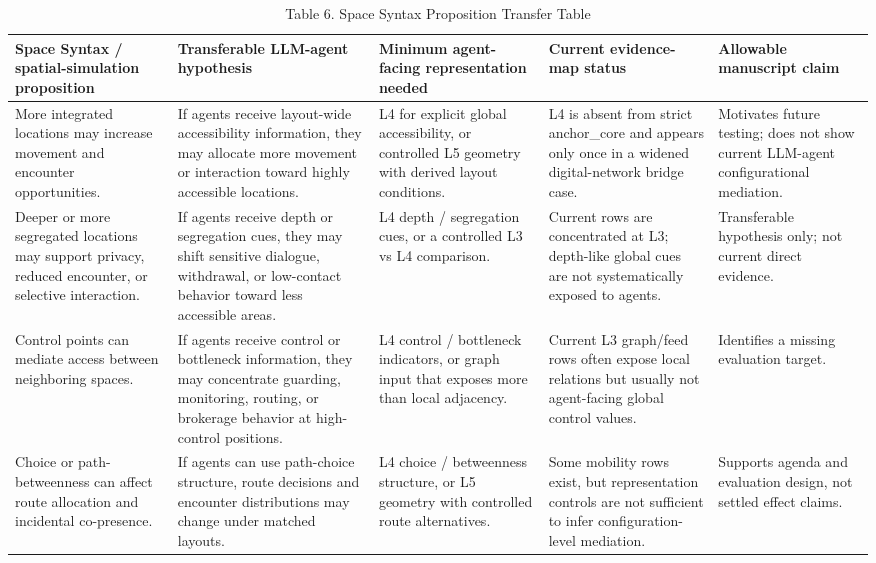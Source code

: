 \documentclass[
  twocolumn]{article}
\begin{document}
\begin{table}[t]
\centering
\caption{Table 6. Space Syntax Proposition Transfer Table}
\scriptsize
\setlength{\tabcolsep}{3pt}
\renewcommand{\arraystretch}{1.12}
\begin{tabular}{@{}>{\raggedright\arraybackslash}p{}|>{\raggedright\arraybackslash}p{}|>{\raggedright\arraybackslash}p{}|>{\raggedright\arraybackslash}p{}|>{\raggedright\arraybackslash}p{}@{}}
\toprule
Space Syntax / spatial-simulation proposition & Transferable LLM-agent hypothesis & Minimum agent-facing representation needed & Current evidence-map status & Allowable manuscript claim \\
\midrule
More integrated locations may increase movement and encounter opportunities. & If agents receive layout-wide accessibility information, they may allocate more movement or interaction toward highly accessible locations. & L4 for explicit global accessibility, or controlled L5 geometry with derived layout conditions. & L4 is absent from strict anchor\_core and appears only once in a widened digital-network bridge case. & Motivates future testing; does not show current LLM-agent configurational mediation. \\
Deeper or more segregated locations may support privacy, reduced encounter, or selective interaction. & If agents receive depth or segregation cues, they may shift sensitive dialogue, withdrawal, or low-contact behavior toward less accessible areas. & L4 depth / segregation cues, or a controlled L3 vs L4 comparison. & Current rows are concentrated at L3; depth-like global cues are not systematically exposed to agents. & Transferable hypothesis only; not current direct evidence. \\
Control points can mediate access between neighboring spaces. & If agents receive control or bottleneck information, they may concentrate guarding, monitoring, routing, or brokerage behavior at high-control positions. & L4 control / bottleneck indicators, or graph input that exposes more than local adjacency. & Current L3 graph/feed rows often expose local relations but usually not agent-facing global control values. & Identifies a missing evaluation target. \\
Choice or path-betweenness can affect route allocation and incidental co-presence. & If agents can use path-choice structure, route decisions and encounter distributions may change under matched layouts. & L4 choice / betweenness structure, or L5 geometry with controlled route alternatives. & Some mobility rows exist, but representation controls are not sufficient to infer configuration-level mediation. & Supports agenda and evaluation design, not settled effect claims. \\

\end{tabular}
\end{table}
\end{document}
